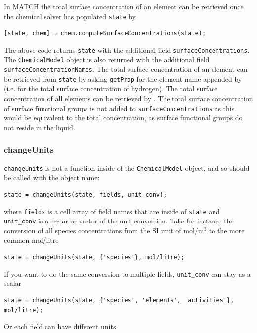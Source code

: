 \documentclass{article}
\begin{document}
In MATCH the total surface concentration of an element can be retrieved once the chemical solver has populated \verb|state| by

\begin{lstlisting}
[state, chem] = chem.computeSurfaceConcentrations(state);
\end{lstlisting}
The above code returns \verb|state| with the additional field \verb|surfaceConcentrations|. The \verb|ChemicalModel| object is also returned with the additional field \verb|surfaceConcentrationNames|. The total surface concentration of an element can be retrieved from \verb|state| by asking \verb|getProp| for the element name appended by  (i.e.  for the total surface concentration of hydrogen). The total surface concentration of all elements can be retrieved by . The total surface concentration of surface functional groups is not added to \verb|surfaceConcentrations| as this would be equivalent to the total concentration, as surface functional groups do not reside in the liquid. 

\subsubsection{changeUnits}
\verb|changeUnits| is not a function inside of the \verb|ChemicalModel| object, and so should be called with the object name:

\begin{lstlisting}
state = changeUnits(state, fields, unit_conv);
\end{lstlisting}
where \verb|fields| is a cell array of field names that are inside of \verb|state| and \verb|unit_conv| is a scalar or vector of the unit conversion. Take for instance the conversion of all species concentrations from the SI unit of mol/m$^3$ to the more common mol/litre

\begin{lstlisting}
state = changeUnits(state, {'species'}, mol/litre);
\end{lstlisting}

If you want to do the same conversion to multiple fields, \verb|unit_conv| can stay as a scalar

\begin{lstlisting}
state = changeUnits(state, {'species', 'elements', 'activities'}, mol/litre);
\end{lstlisting}
Or each field can have different units
\end{document}
